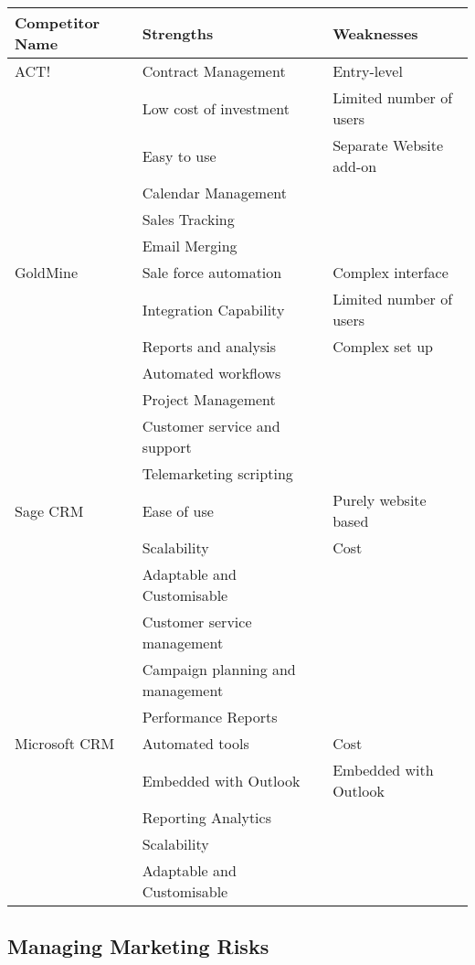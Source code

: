 \documentclass[DIV=calc, paper=a4, fontsize=11pt]{scrartcl}	 %
\begin{document}
\begin{tabular}{|l|p{}|p{}|} \hline
Competitor Name & Strengths & Weaknesses \\ \hline
ACT!     & Contract Management    & Entry-level             \\
         & Low cost of investment & Limited number of users \\
         & Easy to use            & Separate Website add-on \\
         & Calendar Management    &  \\
         & Sales Tracking         &  \\
         & Email Merging          &  \\ \hline
GoldMine & Sale force automation  & Complex interface \\
         & Integration Capability & Limited number of users \\
         & Reports and analysis   & Complex set up \\
         & Automated workflows    &  \\
         & Project Management     &  \\
         & Customer service and support &  \\
         & Telemarketing scripting &  \\ \hline
Sage CRM & Ease of use            & Purely website based \\
         & Scalability            & Cost \\
         & Adaptable and Customisable & \\
         & Customer service management & \\
         & Campaign planning and management & \\
         & Performance Reports    & \\ \hline
Microsoft CRM & Automated tools   & Cost \\
         & Embedded with Outlook  & Embedded with Outlook \\ 
         & Reporting Analytics    &  \\
         & Scalability            &  \\
         & Adaptable and Customisable & \\ \hline

          

\end{tabular}

\subsection{Managing Marketing Risks}
\end{document}
